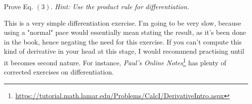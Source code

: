 \documentclass[solutions.tex]{subfiles}
\begin{document}
\maketitle
\begin{exercise} Prove Eq. $(3)$. \textit{Hint: Use the product rule
for differentiation.}
\end{exercise}
This is a very simple differentiation exercise. I'm going to be very slow,
because using a "normal" pace would essentially mean stating the result,
as it's been done in the book, hence negating the need for this exercise.
If you can't compute this kind of derivative in your head at this stage,
I would recommend practising until it becomes second nature. For instance,
\textit{Paul's Online Notes}\footnote{
\url{https://tutorial.math.lamar.edu/Problems/CalcI/DerivativeIntro.aspx}}
has plenty of corrected exercises on differentiation. \\
\end{document}
